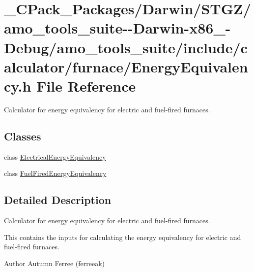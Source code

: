 \hypertarget{___c_pack___packages_2_darwin_2_s_t_g_z_2amo__tools__suite--_darwin-x86__64-_debug_2amo__tools__46d4d8156642b7bcd4be7fa8e6d162d8}{}\section{\+\_\+\+C\+Pack\+\_\+\+Packages/\+Darwin/\+S\+T\+G\+Z/amo\+\_\+tools\+\_\+suite-\/-\/\+Darwin-\/x86\+\_-\/\+Debug/amo\+\_\+tools\+\_\+suite/include/calculator/furnace/\+Energy\+Equivalency.h File Reference}
\label{___c_pack___packages_2_darwin_2_s_t_g_z_2amo__tools__suite--_darwin-x86__64-_debug_2amo__tools__46d4d8156642b7bcd4be7fa8e6d162d8}


Calculator for energy equivalency for electric and fuel-\/fired furnaces.  


\subsection*{Classes}
\begin{DoxyCompactItemize}
\item 
class \hyperlink{class_electrical_energy_equivalency}{Electrical\+Energy\+Equivalency}
\item 
class \hyperlink{class_fuel_fired_energy_equivalency}{Fuel\+Fired\+Energy\+Equivalency}
\end{DoxyCompactItemize}


\subsection{Detailed Description}
Calculator for energy equivalency for electric and fuel-\/fired furnaces. 

This contains the inputs for calculating the energy equivalency for electric and fuel-\/fired furnaces.

\begin{DoxyAuthor}{Author}
Autumn Ferree (ferreeak) 
\end{DoxyAuthor}
